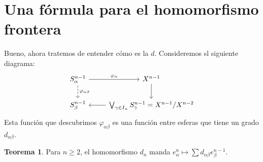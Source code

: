 \documentclass[spanish]{book}
\theoremstyle{definition}
\newtheorem*{teo}{Teorema}
\begin{document}
\section{Una fórmula para el homomorfismo frontera}
	Bueno, ahora tratemos de entender cómo es la $d$. Consideremos sl siguiente diagrama:
	\[\begin{tikzcd}
		S^{n-1}_\alpha\arrow[d,dashed, "\varphi_{\alpha\beta}"]\arrow[r,"\varphi_\alpha"] & X^{n-1} \arrow[d] \\
		S^{n-1}_\beta & \bigvee_{\gamma\in I_n}S^{n-1}_\gamma = X^{n-1}/X^{n-2} \arrow[l]
	\end{tikzcd}\]
	Esta función que descubrimos $\varphi_{\alpha\beta}$ es una función entre esferas que tiene un grado $d_{\alpha\beta}$.
	\begin{teo}
		Para $n\geq 2$, el homomorfismo $d_n$ manda $e^{n}_\alpha\mapsto\sum d_{\alpha\beta}e^{n-1}_\beta$.
	\end{teo}
\end{document}
